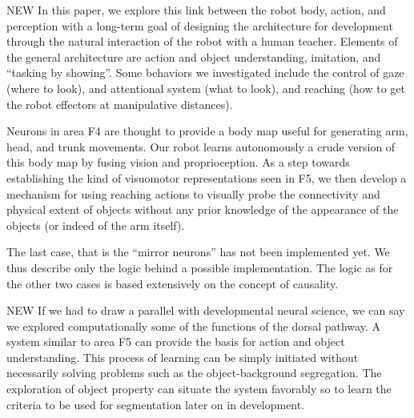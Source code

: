 \ifverbose
NEW In this paper, we explore this link between the robot body, action,
and perception with a long-term goal of designing the architecture for
development through the natural interaction of the robot with a human
teacher. Elements of the general architecture are action and object
understanding, imitation, and ``tasking by showing''. Some behaviors
we investigated include the control of gaze (where to look), and
attentional system (what to look), and reaching (how to get the robot
effectors at manipulative distances).
\fi

Neurons in area F4 are thought to provide a body map useful for
generating arm, head, and trunk movements. Our robot learns
autonomously a crude version of this body map by fusing vision and
proprioception.  As a step towards establishing the kind of visuomotor
representations seen in F5, we then develop a mechanism for using
reaching actions to visually probe the connectivity and physical
extent of objects without any prior knowledge of the appearance of the
objects (or indeed of the arm itself).

\ifverbose
The last case, that is the ``mirror neurons'' has not been implemented
yet.  We thus describe only the logic behind a possible
implementation. The logic as for the other two cases is based
extensively on the concept of causality.
\fi

\ifverbose
NEW If we had to draw a parallel with developmental neural science, we can
say we explored computationally some of the functions of the dorsal
pathway. A system similar to area F5 can provide the basis for action
and object understanding. This process of learning can be simply
initiated without necessarily solving problems such as the
object-background segregation. The exploration of object property can
situate the system favorably so to learn the criteria to be used for
segmentation later on in development.
\fi

